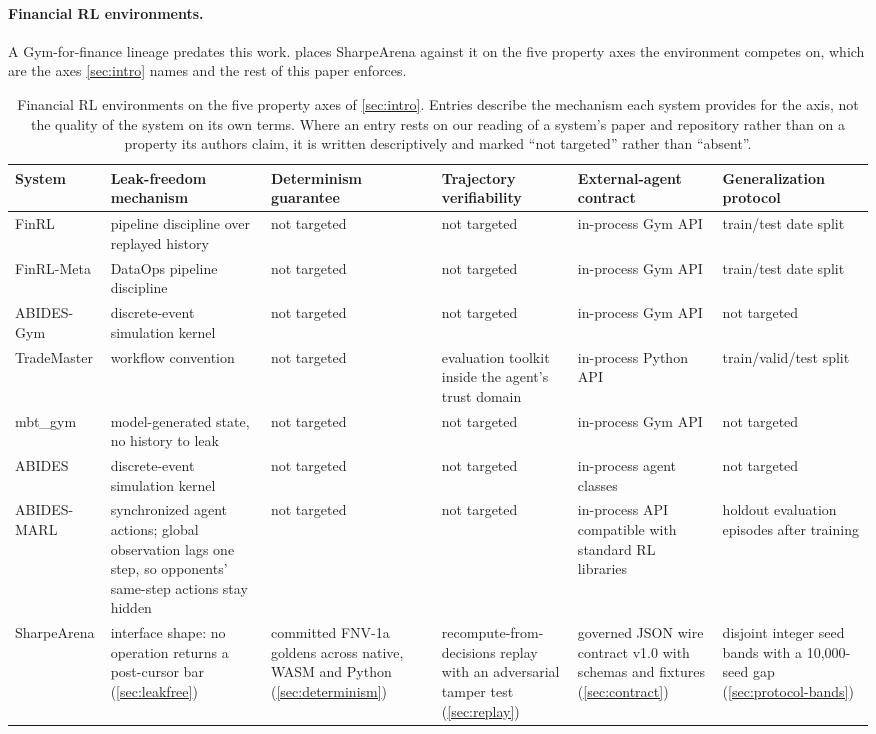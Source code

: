 \paragraph{Financial RL environments.} A Gym-for-finance lineage predates this work.  places SharpeArena against it on the five property axes the environment competes on, which are the axes \cref{sec:intro} names and the rest of this paper enforces.

\begin{table}[t]
\centering
\caption{Financial RL environments on the five property axes of \cref{sec:intro}. Entries describe the mechanism each system provides for the axis, not the quality of the system on its own terms. Where an entry rests on our reading of a system's paper and repository rather than on a property its authors claim, it is written descriptively and marked ``not targeted'' rather than ``absent''.}
\label{tab:related}
\scriptsize
\setlength{\tabcolsep}{3.5pt}
\begin{tabular}{p{1.55cm} p{2.1cm} p{2.0cm} p{2.1cm} p{2.1cm} p{2.0cm}}
\toprule
System & Leak-freedom mechanism & Determinism guarantee & Trajectory verifiability & External-agent contract & Generalization protocol \\
\midrule
FinRL \citep{liu2020finrl} & pipeline discipline over replayed history & not targeted & not targeted & in-process Gym API & train/test date split \\
FinRL-Meta \citep{liu2022finrlmeta} & DataOps pipeline discipline & not targeted & not targeted & in-process Gym API & train/test date split \\
ABIDES-Gym \citep{amrouni2021abidesgym} & discrete-event simulation kernel & not targeted & not targeted & in-process Gym API & not targeted \\
TradeMaster \citep{sun2023trademaster} & workflow convention & not targeted & evaluation toolkit inside the agent's trust domain & in-process Python API & train/valid/test split \\
mbt\_gym \citep{jerome2023mbtgym} & model-generated state, no history to leak & not targeted & not targeted & in-process Gym API & not targeted \\
ABIDES \citep{byrd2020abides} & discrete-event simulation kernel & not targeted & not targeted & in-process agent classes & not targeted \\
ABIDES-MARL \citep{cheridito2025abidesmarl} & synchronized agent actions; global observation lags one step, so opponents' same-step actions stay hidden & not targeted & not targeted & in-process API compatible with standard RL libraries & holdout evaluation episodes after training \\
SharpeArena & interface shape: no operation returns a post-cursor bar (\cref{sec:leakfree}) & committed FNV-1a goldens across native, WASM and Python (\cref{sec:determinism}) & recompute-from-decisions replay with an adversarial tamper test (\cref{sec:replay}) & governed JSON wire contract v1.0 with schemas and fixtures (\cref{sec:contract}) & disjoint integer seed bands with a 10{,}000-seed gap (\cref{sec:protocol-bands}) \\
\bottomrule
\end{tabular}
\end{table}

